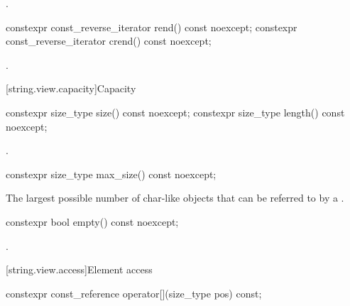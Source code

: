 \begin{itemdescr}
\pnum
\returns
{}.
\end{itemdescr}

%
%
\begin{itemdecl}
constexpr const_reverse_iterator rend() const noexcept;
constexpr const_reverse_iterator crend() const noexcept;
\end{itemdecl}

\begin{itemdescr}
\pnum
\returns
{}.
\end{itemdescr}

[string.view.capacity]{Capacity}

%
%
\begin{itemdecl}
constexpr size_type size() const noexcept;
constexpr size_type length() const noexcept;
\end{itemdecl}

\begin{itemdescr}
\pnum
\returns
{}.
\end{itemdescr}


%
\begin{itemdecl}
constexpr size_type max_size() const noexcept;
\end{itemdecl}

\begin{itemdescr}
\pnum
\returns
The largest possible number of char-like objects
that can be referred to by a .
\end{itemdescr}

%
\begin{itemdecl}
constexpr bool empty() const noexcept;
\end{itemdecl}

\begin{itemdescr}
\pnum
\returns
{}.
\end{itemdescr}

[string.view.access]{Element access}

%
\begin{itemdecl}
constexpr const_reference operator[](size_type pos) const;
\end{itemdecl}

